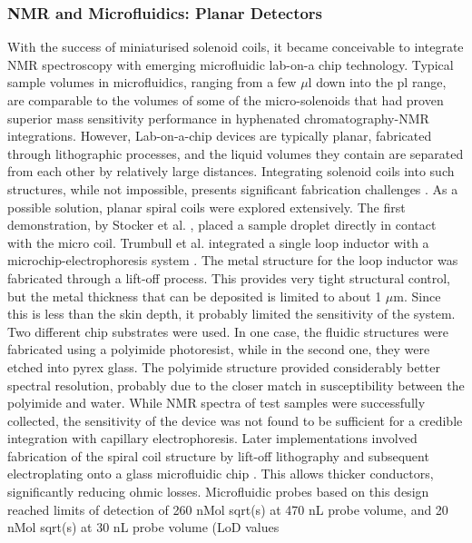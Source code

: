\subsubsection{NMR and Microfluidics: Planar
Detectors}\label{nmr-and-microfluidics-planar-detectors}

With the success of miniaturised solenoid coils, it became conceivable
to integrate NMR spectroscopy with emerging microfluidic lab-on-a chip
technology. Typical sample volumes in microfluidics, ranging from a few
$\mu$l down into the pl range, are comparable to the volumes of some of
the micro-solenoids that had proven superior mass sensitivity
performance in hyphenated chromatography-NMR integrations. However,
Lab-on-a-chip devices are typically planar, fabricated through
lithographic processes, and the liquid volumes they contain are
separated from each other by relatively large distances. Integrating
solenoid coils into such structures, while not impossible, presents
significant fabrication challenges \cite{Badilita:2010hb}. As a possible
solution, planar spiral coils were explored extensively. The first
demonstration, by Stocker et al. \cite{Stocker:1997by}, placed a sample
droplet directly in contact with the micro coil. Trumbull et al.
integrated a single loop inductor with a microchip-electrophoresis
system \cite{Trumbull:2000vb}. The metal structure for the loop inductor
was fabricated through a lift-off process. This provides very tight
structural control, but the metal thickness that can be deposited is
limited to about 1 $\mu$m. Since this is less than the skin depth, it
probably limited the sensitivity of the system. Two different chip
substrates were used. In one case, the fluidic structures were
fabricated using a polyimide photoresist, while in the second one, they
were etched into pyrex glass. The polyimide structure provided
considerably better spectral resolution, probably due to the closer
match in susceptibility between the polyimide and water. While NMR
spectra of test samples were successfully collected, the sensitivity of
the device was not found to be sufficient for a credible integration
with capillary electrophoresis. Later implementations involved
fabrication of the spiral coil structure by lift-off lithography and
subsequent electroplating onto a glass microfluidic chip
\cite{Massin:2002bj}. This allows thicker conductors, significantly
reducing ohmic losses. Microfluidic probes based on this design
\cite{massin2003pmb} reached limits of detection of 260 nMol sqrt(s) at 470
nL probe volume, and 20 nMol sqrt(s) at 30 nL probe volume (LoD values
